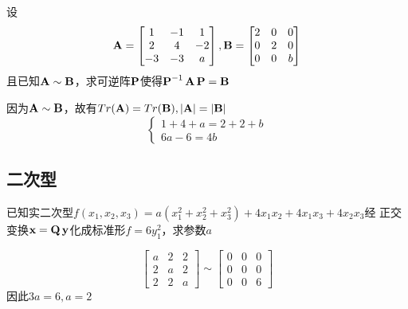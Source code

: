 \documentclass{article}
\begin{document}
\begin{examplle}[]
设
\begin{equation*}
\operatorname{\textbf{A}}=
\begin{bmatrix}
1&-1&1\\2&4&-2\\-3&-3&a
\end{bmatrix},
\operatorname{\textbf{B}}=
\begin{bmatrix}
2&0&0\\
0&2&0\\
0&0&b
\end{bmatrix}
\end{equation*}
且已知\(\operatorname{\textbf{A}}\sim\operatorname{\textbf{B}}\)，求可逆阵\(\operatorname{\textbf{P}}\)使得\(\operatorname{\textbf{P}}^{-1}\operatorname{\textbf{A}}\operatorname{\textbf{P}}=\operatorname{\textbf{B}}\)

因为\(\operatorname{\textbf{A}}\sim\operatorname{\textbf{B}}\)，故有\(Tr(\bA)=Tr(\bB),\abs{\bA}=\abs{\bB}\)
\begin{equation*}
\begin{cases}
1+4+a=2+2+b\\
6a-6=4b
\end{cases}
\end{equation*}
\end{examplle}
\subsection{二次型}
\label{sec:org1c58af5}



\begin{examplle}[]
已知实二次型\(f(x_1,x_2,x_3)=a(x_1^2+x_2^2+x_3^2)+4x_1x_2+4x_1x_3+4x_2x_3\)经
正交变换\(\operatorname{\textbf{x}}=\operatorname{\textbf{Q}}\operatorname{\textbf{y}}\)化成标准形\(f=6y_1^2\)，求参数\(a\)

\begin{equation*}
\begin{bmatrix}
a&2&2\\
2&a&2\\
2&2&a
\end{bmatrix}\sim
\begin{bmatrix}
0&0&0\\
0&0&0\\
0&0&6
\end{bmatrix}
\end{equation*}
因此\(3a=6,a=2\)
\end{examplle}
\end{document}
